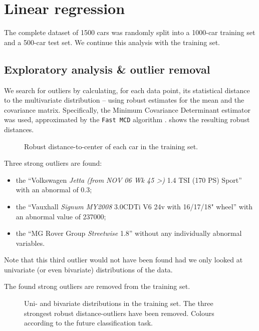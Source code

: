 \documentclass[a4paper, 12pt]{article}
\newcommand{\varr}[1]{\texttt{\StrSubstitute{#1}{ }{\_\allowbreak}}}
\newcommand{\car}[3]{``#1 \textit{#2} #3''}
\newcommand{\wide}[1]{\makebox[\textwidth][c]{#1}%
}
\newcommand{\widefig}[1]{\wide{\texttt{[image: \#1]}}}
\begin{document}



\section{Linear regression}

The complete dataset of 1500 cars was randomly split into a 1000-car training set and a 500-car test set. We continue this analysis with the training set.

\subsection*{Exploratory analysis \& outlier removal}
\label{sec:RD_outlier_removal}

We search for outliers by calculating, for each data point, its statistical distance to the multivariate distribution -- using robust estimates for the mean and the covariance matrix. Specifically, the Minimum Covariance Determinant estimator \cite{mcd} was used, approximated by the \texttt{Fast MCD} algorithm \cite{fastmcd}.  shows the resulting robust distances.

\begin{figure}%
  \widefig{fig/multivar_outlier_all}
  \vspace{1mm} \newline
  \widefig{fig/multivar_outlier_zoom}
  \caption{Robust distance-to-center of each car in the training set.}
  \label{fig:RD_outliers}
\end{figure}

Three strong outliers are found:
\begin{itemize}[topsep=0pt,itemsep=0pt]
  \item the \car{Volkswagen}{Jetta (from NOV 06 Wk 45 >)}{1.4 TSI (170 PS) Sport} with an abnormal \varr{noise level} of 0.3;
  \item the \car{Vauxhall}{Signum MY2008}{3.0CDTi V6 24v with 16/17/18" wheel} with an abnormal \varr{nox emissions} value of 237000;
  \item the \car{MG Rover Group}{Streetwise}{1.8} without any individually abnormal variables.
\end{itemize}
Note that this third outlier would not have been found had we only looked at univariate (or even bivariate) distributions of the data.

The found strong outliers are removed from the training set.


\begin{figure}%
  \widefig{fig/pairs_euro-coloured}
  \caption{Uni- and bivariate distributions in the training set. The three strongest robust distance-outliers have been removed. Colours according to the future classification task. }
  \label{fig:pairs}
\end{figure}
\end{document}
